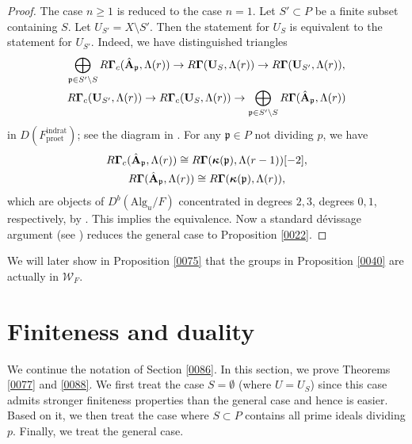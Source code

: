 \documentclass{amsart}
\theoremstyle{remark}
\numberwithin{equation}{section}
\newcommand{\et}{\mathrm{et}}
\newcommand{\rat}{\mathrm{rat}}
\newcommand{\ind}{\mathrm{ind}}
\newcommand{\pro}{\mathrm{pro}}
\newcommand{\Alg}{\mathrm{Alg}}
\newcommand{\alg}[1]{\mathbf{#1}}
\newcommand{\ideal}[1]{\mathfrak{#1}}
\newcommand{\varalg}[1]{\bm{#1}}
\begin{document}
\begin{proof}
	The case $n \ge 1$ is reduced to the case $n = 1$.
	Let $S' \subset P$ be a finite subset containing $S$.
	Let $U_{S'} = X \setminus S'$.
	Then the statement for $U_{S}$ is equivalent to the statement for $U_{S'}$.
	Indeed, we have distinguished triangles
		\begin{gather*}
					\bigoplus_{\ideal{p} \in S' \setminus S}
						R \alg{\Gamma}_{c}(\Hat{\alg{A}}_{\ideal{p}}, \Lambda(r))
				\to
					R \alg{\Gamma}(\alg{U}_{S}, \Lambda(r))
				\to
					R \alg{\Gamma}(\alg{U}_{S'}, \Lambda(r)),
			\\
					R \alg{\Gamma}_{c}(\alg{U}_{S'}, \Lambda(r))
				\to
					R \alg{\Gamma}_{c}(\alg{U}_{S}, \Lambda(r))
				\to
					\bigoplus_{\ideal{p} \in S' \setminus S}
						R \alg{\Gamma}(\Hat{\alg{A}}_{\ideal{p}}, \Lambda(r))
		\end{gather*}
	in $D(F^{\ind\rat}_{\pro\et})$;
	see the diagram in \cite[Section 10.6]{Suz24}.
	For any $\ideal{p} \in P$ not dividing $p$, we have
		\begin{gather*}
					R \alg{\Gamma}_{c}(\Hat{\alg{A}}_{\ideal{p}}, \Lambda(r))
				\cong
					R \alg{\Gamma}(\varalg{\kappa}(\ideal{p}), \Lambda(r - 1))[-2],
			\\
					R \alg{\Gamma}(\Hat{\alg{A}}_{\ideal{p}}, \Lambda(r))
				\cong
					R \alg{\Gamma}(\varalg{\kappa}(\ideal{p}), \Lambda(r)),
		\end{gather*}
	which are objects of $D^{b}(\Alg_{u} / F)$ concentrated in
	degrees $2, 3$, degrees $0, 1$, respectively, by \cite[Theorem 7.2.4]{Suz24}.
	This implies the equivalence.
	Now a standard d\'evissage argument (see \cite[Section 10.6]{Suz24})
	reduces the general case to Proposition \ref{0022}.
\end{proof}

We will later show in Proposition \ref{0075}
that the groups in Proposition \ref{0040} are actually in $\mathcal{W}_{F}$.


\section{Finiteness and duality}
\label{0115}

We continue the notation of Section \ref{0086}.
In this section, we prove Theorems \ref{0077} and \ref{0088}.
We first treat the case $S = \emptyset$ (where $U = U_{S}$)
since this case admits stronger finiteness properties than the general case
and hence is easier.
Based on it, we then treat the case where $S \subset P$ contains all prime ideals dividing $p$.
Finally, we treat the general case.
\end{document}
